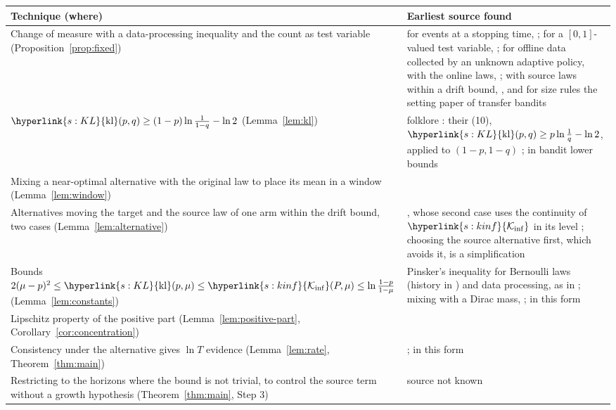 \documentclass[11pt]{article}
\newcommand{\sy}[2]{\hyperlink{#1}{#2}}
\newcommand{\kl}{\sy{s:KL}{\mathrm{kl}}}
\newcommand{\Kinf}{\sy{s:kinf}{\mathcal{K}_{\inf}}}
\begin{document}
\begin{center}
\begin{tabular}{@{}p{}p{}@{}}
\toprule
Technique (where) & Earliest source found \\
\midrule
\raggedright Change of measure with a data-processing inequality and the count as test variable
(Proposition~\ref{prop:fixed}) & for events at a stopping time, \citet[Lemma~1]{KCG16}; for a
$[0,1]$-valued test variable, \citet[(6), (10), Lemma~1]{GMS19}; for offline data collected by an
unknown adaptive policy, with the online laws, \citet[Appendix~B.1, (10)]{AJSS23}; with source laws
within a drift bound, \citet[Appendix~E, Lemmas~22 and~24]{PMRM26}, and for size rules the setting paper of transfer bandits \citep[Corollary~4.2]{INC-P003} \\[2pt]
\raggedright $\kl(p,q)\ge(1-p)\ln\frac1{1-q}-\ln2$ (Lemma~\ref{lem:kl}) & folklore \citep[Section~7]{GMS20}: their
(10), $\kl(p,q)\ge p\ln\frac1q-\ln2$, applied to $(1-p,1-q)$ \citep[(10)]{GMS20}; in bandit lower
bounds \citet[(10)--(11)]{GMS19} \\
\raggedright Mixing a near-optimal alternative with the original law to place its mean in a
window (Lemma~\ref{lem:window}) & \citet[Lemma~23]{PMRM26} \\
\raggedright Alternatives moving the target and the source law of one arm within the drift bound,
two cases (Lemma~\ref{lem:alternative}) & \citet[Appendix~E]{PMRM26}, whose second case uses the
continuity of $\Kinf$ in its level \citep[Lemma~2 and Theorems~7--8]{HT10}; choosing the source
alternative first, which avoids it, is a simplification \\
\raggedright Bounds $2(\mu-p)^2\le\kl(p,\mu)\le\Kinf(P,\mu)\le\ln\frac{1-p}{1-\mu}$
(Lemma~\ref{lem:constants}) & Pinsker's inequality for Bernoulli laws (history in
\citealp[Sections~3--4]{Rio23}) and data processing, as in \citet[(7)]{GHMS22}; mixing with a
Dirac mass, \citet[Appendix~B.1]{GHMS22}; in this form \citet[Proposition~4.2]{INC-P006} \\
\raggedright Lipschitz property of the positive part (Lemma~\ref{lem:positive-part},
Corollary~\ref{cor:concentration}) & \citet[Appendix~D]{PMRM26} \\
\raggedright Consistency under the alternative gives $\ln T$ evidence (Lemma~\ref{lem:rate},
Theorem~\ref{thm:main}) & \citet{LR85}; in this form \citet[Theorem~1]{GMS19} \\
\raggedright Restricting to the horizons where the bound is not trivial, to control the source term
without a growth hypothesis (Theorem~\ref{thm:main}, Step 3) & source not known \\
\bottomrule
\end{tabular}
\end{center}
\end{document}
